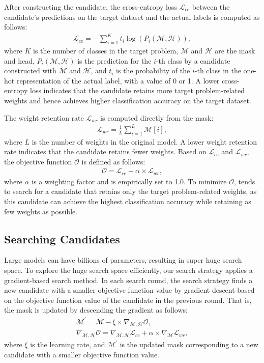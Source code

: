 After constructing the candidate, the cross-entropy loss $\mathcal{L}_{ce}$ between the candidate's predictions on the target dataset and the actual labels is computed as follows:
\begin{gather}
    \mathcal{L}_{ce}=-\sum_{i=1}^K t_i \log(P_i(\mathcal{M}, \mathcal{H})),
\end{gather}
where $K$ is the number of classes in the target problem, $\mathcal{M}$ and $\mathcal{H}$ are the mask and head, $P_i(\mathcal{M}, \mathcal{H})$ is the prediction for the $i$-th class by a candidate constructed with $\mathcal{M}$ and $\mathcal{H}$, and $t_i$ is the probability of the $i$-th class in the one-hot representation of the actual label, with a value of 0 or 1.
A lower cross-entropy loss indicates that the candidate retains more target problem-related weights and hence achieves higher classification accuracy on the target dataset.

The weight retention rate $\mathcal{L}_{wr}$ is computed directly from the mask:
\begin{gather}
    \mathcal{L}_{wr}=\frac{1}{L}\sum_{i=1}^L \mathcal{M}[i],
\end{gather}
where $L$ is the number of weights in the original model.
A lower weight retention rate indicates that the candidate retains fewer weights.
Based on $\mathcal{L}_{ce}$ and $\mathcal{L}_{wr}$, the objective function $\mathcal{O}$ is defined as follows:
\begin{gather}
    \mathcal{O}=\mathcal{L}_{ce} + \alpha \times \mathcal{L}_{wr}, \label{eq:loss}
\end{gather}
where $\alpha$ is a weighting factor and is empirically set to 1.0. %
To minimize $\mathcal{O}$, \projectName tends to search for a candidate that retains only the target problem-related weights, as this candidate can achieve the highest classification accuracy while retaining as few weights as possible.



\subsection{Searching Candidates}
Large models can have billions of parameters, resulting in super huge search space.
To explore the huge search space efficiently, our search strategy applies a gradient-based search method.
In each search round, the search strategy finds a new candidate with a smaller objective function value by gradient descent based on the objective function value of the candidate in the previous round.
That is, the mask is updated by descending the gradient as follows:
\begin{gather}
    \mathcal{M^{'}} = \mathcal{M} - \xi \times \nabla_{\mathcal{M},\mathcal{H}}\mathcal{O}, \label{eq:update} \\
    \nabla_{\mathcal{M},\mathcal{H}}\mathcal{O}=\nabla_{\mathcal{M}, \mathcal{H}}\mathcal{L}_{ce} + \alpha \times \nabla_{\mathcal{M}}\mathcal{L}_{wr},
\end{gather}
where $\xi$ is the learning rate, and $\mathcal{M^{'}}$ is the updated mask corresponding to a new candidate with a smaller objective function value.

